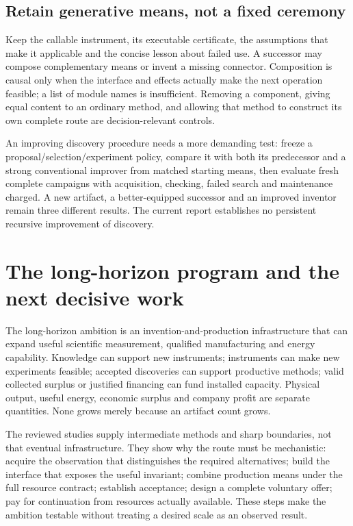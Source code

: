\documentclass[11pt,letterpaper]{article}
\begin{document}
\subsection{Retain generative means, not a fixed ceremony}
Keep the callable instrument, its executable certificate, the assumptions that make it applicable and the concise lesson about failed use. A successor may compose complementary means or invent a missing connector. Composition is causal only when the interface and effects actually make the next operation feasible; a list of module names is insufficient. Removing a component, giving equal content to an ordinary method, and allowing that method to construct its own complete route are decision-relevant controls.

An improving discovery procedure needs a more demanding test: freeze a proposal/selection/experiment policy, compare it with both its predecessor and a strong conventional improver from matched starting means, then evaluate fresh complete campaigns with acquisition, checking, failed search and maintenance charged. A new artifact, a better-equipped successor and an improved inventor remain three different results. The current report establishes no persistent recursive improvement of discovery.

\section{The long-horizon program and the next decisive work}
The long-horizon ambition is an invention-and-production infrastructure that can expand useful scientific measurement, qualified manufacturing and energy capability. Knowledge can support new instruments; instruments can make new experiments feasible; accepted discoveries can support productive methods; valid collected surplus or justified financing can fund installed capacity. Physical output, useful energy, economic surplus and company profit are separate quantities. None grows merely because an artifact count grows.

The reviewed studies supply intermediate methods and sharp boundaries, not that eventual infrastructure. They show why the route must be mechanistic: acquire the observation that distinguishes the required alternatives; build the interface that exposes the useful invariant; combine production means under the full resource contract; establish acceptance; design a complete voluntary offer; pay for continuation from resources actually available. These steps make the ambition testable without treating a desired scale as an observed result.
\end{document}
